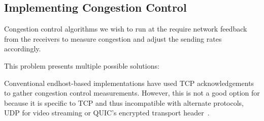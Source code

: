 

\subsection{Implementing Congestion Control}\label{s:design:twosided}
Congestion control algorithms we wish to run at the \inbox require network feedback from the receivers to measure congestion and adjust the sending rates accordingly. 

This problem presents multiple possible solutions:

Conventional endhost-based implementations have used TCP acknowledgements to gather congestion control measurements.
However, this is not a good option for \name because 
it is specific to TCP and thus incompatible with alternate protocols, \ie UDP for video streaming or QUIC's encrypted transport header~\cite{quic}.

